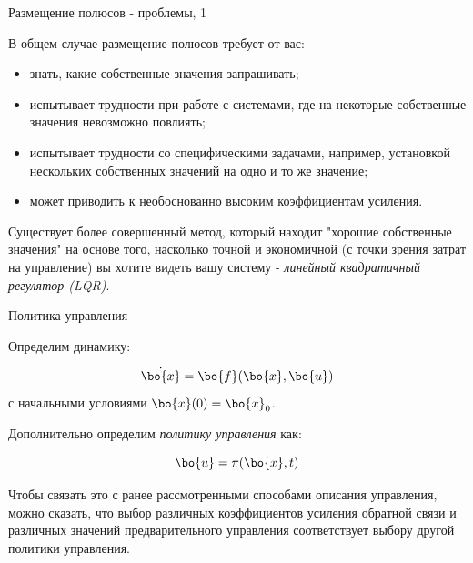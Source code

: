 \documentclass{beamer}
\begin{document}
\begin{frame}{Размещение полюсов - проблемы, 1}
	\begin{flushleft}
		
		В общем случае размещение полюсов требует от вас:
		
		\begin{itemize}
			\item знать, какие собственные значения запрашивать;
			
			\item испытывает трудности при работе с системами, где на некоторые собственные значения невозможно повлиять;
			
			\item испытывает трудности со специфическими задачами, например, установкой нескольких собственных значений на одно и то же значение;
			
			\item может приводить к необоснованно высоким коэффициентам усиления.
		\end{itemize}
		
		Существует более совершенный метод, который находит "хорошие собственные значения" на основе того, насколько точной и экономичной (с точки зрения затрат на управление) вы хотите видеть вашу систему - \emph{линейный квадратичный регулятор (LQR)}.
		
	\end{flushleft}
\end{frame}


\begin{frame}{Политика управления}
	\begin{flushleft}
		
		Определим динамику:
		
		\begin{equation}
			\dot {\bo{x}} = \bo{f} (\bo{x}, \bo{u})
		\end{equation}
		с начальными условиями $\bo{x}(0)=\bo{x}_0$. 
		
		\bigskip
		
		Дополнительно определим \emph{политику управления} как:
		
		\begin{equation}
			\bo{u} = \pi (\bo{x}, t)
		\end{equation}
		
		Чтобы связать это с ранее рассмотренными способами описания управления, можно сказать, что выбор различных коэффициентов усиления обратной связи и различных значений предварительного управления соответствует выбору другой политики управления.
		
	\end{flushleft}
\end{frame}
\end{document}
